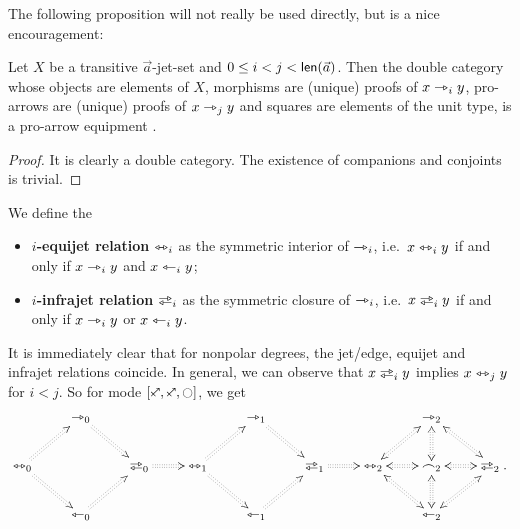 \documentclass[a4paper]{memoir}
\begin{document}
The following proposition will not really be used directly, but is a nice encouragement:
\begin{proposition} \label{thm:jetset-equipment}
	Let $X$ be a transitive $\vec a$-jet-set and $0 \leq i < j < \mathsf{len}(\vec a)$.
	Then the double category whose objects are elements of $X$, morphisms are (unique) proofs of $x \rightarrowtriangle_i y$, pro-arrows are (unique) proofs of $x \rightarrowtriangle_{j} y$ and squares are elements of the unit type, is a pro-arrow equipment \cite{nlab:proarrow,proarrow1,proarrow2}.
\end{proposition}
\begin{proof}
	It is clearly a double category. The existence of companions and conjoints is trivial.
\end{proof}
\begin{definition}
	We define the
	\begin{itemize}
		\item \textbf{$i$-equijet relation} $\leftrightarrowtriangle_i$ as the symmetric interior of $\rightarrowtriangle_i$, i.e.\ $x \leftrightarrowtriangle_i y$ if and only if $x \rightarrowtriangle_i y$ and $x \leftarrowtriangle_i y$;
		\item \textbf{$i$-infrajet relation} $\infrajet_i$ as the symmetric closure of $\rightarrowtriangle_i$, i.e.\ $x \infrajet_i y$ if and only if $x \rightarrowtriangle_i y$ or $x \leftarrowtriangle_i y$.
	\end{itemize}
\end{definition}
It is immediately clear that for nonpolar degrees, the jet/edge, equijet and infrajet relations coincide.
In general, we can observe that $x \infrajet_i y$ implies $x \leftrightarrowtriangle_j y$ for $i < j$.
So for mode $[\ypolar, \ypolar, \npolar]$, we get
\[
\xymatrix{
	& 
	\jet_0
		\ar@{:>}[rd]
	&&& 
	\jet_1 
		\ar@{:>}[rd]
	&&& 
	\jet_2 
		\ar@{<:>}[rd]
	\\
	\equijet_0
		\ar@{:>}[ru]
		\ar@{:>}[rd]
	&&
	\infrajet_0
		\ar@{:>}[r]
	&
	\equijet_1
		\ar@{:>}[ru]
		\ar@{:>}[rd]
	&&
	\infrajet_1
		\ar@{:>}[r]
	&
	\equijet_2
		\ar@{<:>}[ru]
		\ar@{<:>}[rd]
	&
	\edge_2
		\ar@{<:>}[l]
		\ar@{<:>}[u]
		\ar@{<:>}[r]
		\ar@{<:>}[d]
	&
	\infrajet_2.
	\\
	& 
	\tej_0 
		\ar@{:>}[ru]
	&&& 
	\tej_1 
		\ar@{:>}[ru]
	&&& 
	\tej_2 
		\ar@{<:>}[ru]
}
\]
\end{document}
